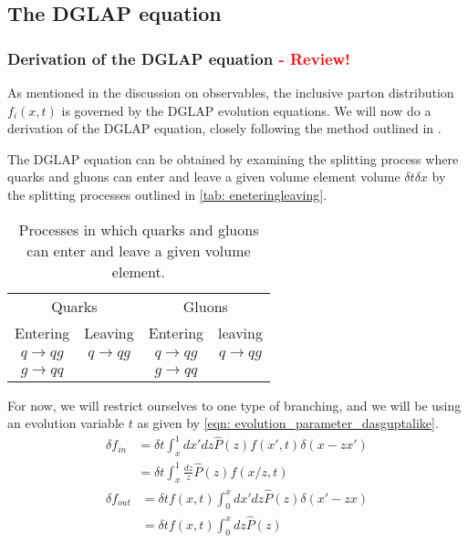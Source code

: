 \documentclass[main.tex]{subfiles}
\begin{document}
\subsection{The DGLAP equation} %
\subsubsection{Derivation of the DGLAP equation \textcolor{red}{ - Review!}}
As mentioned in the discussion on observables, the inclusive parton distribution \(f_i(x,t)\) is governed by the DGLAP evolution equations. We will now do a derivation of the DGLAP equation, closely following the method outlined in \cite{ellis_stirling_webber_1996}.

The DGLAP equation can be obtained by examining the splitting process where quarks and gluons can enter and leave a given volume element volume \(\delta t \delta x\) by the splitting processes outlined in \autoref{tab: eneteringleaving}.
\begin{table}[h]
    \centering
    \begin{tabular}[]{cccc}
        \multicolumn{2}{c}{Quarks} & \multicolumn{2}{c}{Gluons} \\
        \cmidrule(lr){1-2} \cmidrule(lr){3-4}
        Entering & Leaving & Entering & leaving \\
        \cmidrule(lr){1-1}\cmidrule(lr){2-2}\cmidrule(lr){3-3}\cmidrule(lr){4-4}
        \(q \rightarrow qg\) & \(q \rightarrow qg\) & \(q \rightarrow qg\) & \(q \rightarrow qg\) \\
        \(g \rightarrow qq\) & \(\) & \(g \rightarrow qq\) & \(\) \\
        \bottomrule
    \end{tabular}
    \caption{Processes in which quarks and gluons can enter and leave a given volume element.}
    \label{tab: eneteringleaving}
\end{table}
For now, we will restrict ourselves to one type of branching, and we will be using an evolution variable \(t\) as given by \autoref{eqn: evolution_parameter_dasguptalike}.
\begin{align}
    \delta f_{in} &= \delta t \int_x^1 dx' dz \hat{P}(z) f(x',t) \delta (x-zx') \nonumber\\
    &= \delta t \int_x^1 \frac{dz}{z} \hat{P}(z) f(x/z,t)
\end{align}
\begin{align}
    \delta f_{out} &= \delta t f(x,t) \int_0^x dx' dz \hat{P}(z) \delta (x'-zx) \nonumber \\
    &= \delta t f(x,t) \int_0^x dz\hat{P}(z) 
\end{align}
\end{document}
